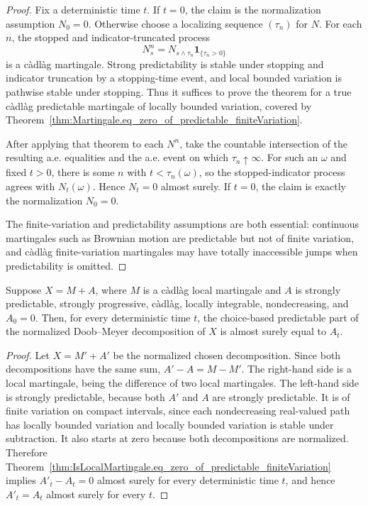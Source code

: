 \begin{proof}

\leanok
Fix a deterministic time \(t\).  If \(t=0\), the claim is the normalization
assumption \(N_0=0\).  Otherwise choose a localizing sequence \((\tau_n)\)
for \(N\).  For each \(n\), the stopped and indicator-truncated process
\[
  N^n_s
  =
  N_{s\wedge\tau_n}\mathbf 1_{\{\tau_n>0\}}
\]
is a càdlàg martingale.  Strong predictability is stable under stopping and
indicator truncation by a stopping-time event, and local bounded variation is
pathwise stable under stopping.  Thus it suffices to prove the theorem for a
true càdlàg predictable martingale of locally bounded variation, covered by
Theorem~\ref{thm:Martingale.eq_zero_of_predictable_finiteVariation}.

After applying that theorem to each \(N^n\), take the countable intersection
of the resulting a.e. equalities and the a.e. event on which
\(\tau_n\uparrow\infty\).  For such an \(\omega\) and fixed \(t>0\), there is
some \(n\) with \(t<\tau_n(\omega)\), so the stopped-indicator process agrees
with \(N_t(\omega)\).  Hence \(N_t=0\) almost surely.  If \(t=0\), the claim
is exactly the normalization \(N_0=0\).

The finite-variation and predictability assumptions are both essential:
continuous martingales such as Brownian motion are predictable but not of
finite variation, and càdlàg finite-variation martingales may have totally
inaccessible jumps when predictability is omitted.
\end{proof}


\begin{lemma}\label{lem:predictablePart_eq_of_normalized_decomposition}
  \leanok
Suppose \(X=M+A\), where \(M\) is a càdlàg local martingale and \(A\) is
strongly predictable, strongly progressive, càdlàg, locally integrable,
nondecreasing, and \(A_0=0\).  Then, for every deterministic time \(t\),
the choice-based predictable part of the normalized Doob--Meyer
decomposition of \(X\) is almost surely equal to \(A_t\).
\end{lemma}

\begin{proof}

\leanok
Let \(X=M'+A'\) be the normalized chosen decomposition.  Since both
decompositions have the same sum, \(A'-A=M-M'\).  The right-hand side is
a local martingale, being the difference of two local martingales.  The
left-hand side is strongly predictable, because both \(A'\) and \(A\) are
strongly predictable.  It is of finite variation on compact intervals,
since each nondecreasing real-valued path has locally bounded variation and
locally bounded variation is stable under subtraction.  It also starts at
zero because both decompositions are normalized.  Therefore
Theorem~\ref{thm:IsLocalMartingale.eq_zero_of_predictable_finiteVariation}
implies \(A'_t-A_t=0\) almost surely for every deterministic time \(t\),
and hence \(A'_t=A_t\) almost surely for every \(t\).
\end{proof}
